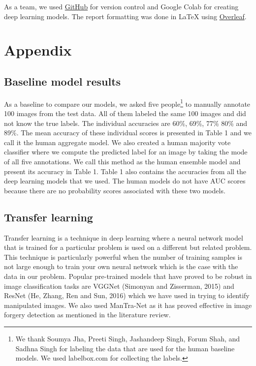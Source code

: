 \documentclass[11pt]{article}
\begin{document}
As a team, we used \href{https://github.com/arathee2/fake-or-not}{GitHub} for version control and Google Colab for creating deep learning models. The report formatting was done in \LaTeX \hspace{0.25mm} using \href{https://www.overleaf.com/read/pvdqzbpfdzzj
}{Overleaf}.

\newpage

\section{Appendix}

\subsection{Baseline model results}

As a baseline to compare our models, we asked five people\footnote{We thank Soumya Jha, Preeti Singh, Jashandeep Singh, Forum Shah, and Sadhna Singh for labeling the data that are used for the human baseline models. We used labelbox.com for collecting the labels.} to manually annotate 100 images from the test data. All of them labeled the same 100 images and did not know the true labels. The individual accuracies are 60\%, 69\%, 77\% 80\% and 89\%. The mean accuracy of these individual scores is presented in Table 1 and we call it the human aggregate model. We also created a human majority vote classifier where we compute the predicted label for an image by taking the mode of all five annotations. We call this method as the human ensemble model and present its accuracy in Table 1. Table 1 also contains the accuracies from all the deep learning models that we used. The human models do not have AUC scores because there are no probability scores associated with these two models.

\subsection{Transfer learning}

Transfer learning is a technique in deep learning where a neural network model that is trained for a particular problem is used on a different but related problem. This technique is particularly powerful when the number of training samples is not large enough to train your own neural network which is the case with the data in our problem. Popular pre-trained models that have proved to be robust in image classification tasks are VGGNet (Simonyan and Zisserman, 2015) and ResNet (He, Zhang, Ren and Sun, 2016) which we have used in trying to identify manipulated images. We also used ManTra-Net as it has proved effective in image forgery detection as mentioned in the literature review.
\end{document}
